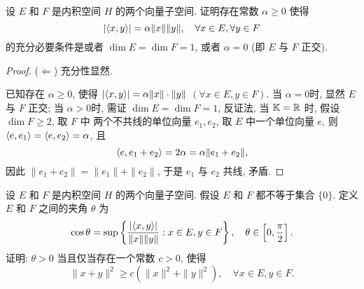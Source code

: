 \begin{exercise}
设 $E$ 和 $F$ 是内积空间 $H$ 的两个向量子空间. 证明存在常数 $\alpha\geq 0$ 使得
\[|\langle x,y\rangle|=\alpha\|x\|\|y\|,\quad\forall x\in E,\forall y\in F\]
的充分必要条件是或者 $\dim E=\dim F=1$, 或者 $\alpha=0$ (即 $E$ 与 $F$ 正交).
\end{exercise}

\begin{proof}
($\Leftarrow$)
充分性显然.

\necessary
已知存在 $\alpha\geq 0$, 使得 
$|\langle x,y\rangle|=\alpha \|x\|\cdot\|y\|$ $(\forall x\in E,y\in F)$.
当 $\alpha=0$时, 显然 $E$ 与 $F$ 正交;
当 $\alpha>0$时, 需证  $\dim E=\dim F=1$, 
反证法, 当 $\mathbb{K}=\mathbb{R}$ 时, 假设 $\dim F\geq 2$, 取 $F$ 中
两个不共线的单位向量 $e_1,e_2$, 取 $E$ 中一个单位向量 $e$,
则 $\langle e,e_1\rangle=\langle e,e_2\rangle=\alpha$, 且
\[\langle e,e_1+e_2\rangle=2\alpha=\alpha\|e_1+e_2\|,\]
因此 $\|e_1+e_2\|=\|e_1\|+\|e_2\|$, 于是 $e_1$ 与 $e_2$ 共线, 矛盾.
\end{proof}




\begin{exercise}
    设 $E$ 和 $F$ 是内积空间 $H$ 的两个向量子空间.
    假设 $E$ 和 $F$ 都不等于集合 $\{0\}$.
    定义 $E$ 和 $F$ 之间的夹角 $\theta$ 为
    \[\cos\theta=\sup\left\{\frac{|\langle x,y\rangle|}{\|x\|\|y\|}:x\in E, y\in F\right\},\quad\theta\in\left[0,\frac{\pi}{2}\right].\]
    证明: $\theta>0$ 当且仅当存在一个常数 $c>0$, 使得
    \[\|x+y\|^2\geq c(\|x\|^2+\|y\|^2),\quad\forall x\in E, y\in F.\]
\end{exercise}


